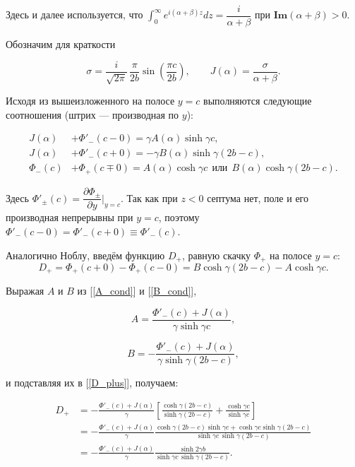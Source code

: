 \documentclass[a4paper,12pt]{article}
\begin{document}
Здесь и далее используется, что $\int_0^\infty e^{i(\alpha+\beta)z}dz = \dfrac{i}{\alpha+\beta}$ при $\mathbf{Im}(\alpha+\beta) > 0$.

Обозначим для краткости

\begin{equation}
\sigma = \frac{i}{\sqrt{2\pi}}\,\dfrac{\pi}{2b}\sin\!\left(\dfrac{\pi c}{2b}\right),
\qquad
J(\alpha)=
\frac{\sigma}{\alpha+\beta}.
\end{equation}

Исходя из вышеизложенного на полосе $y = c$ выполняются следующие соотношения (штрих --- производная по $y$):

\begin{align}
J(\alpha) &+ \Phi'_-(c-0) = \gamma A(\alpha)\sinh\gamma c, \label{A_cond} \\
J(\alpha) &+ \Phi'_-(c+0) = -\gamma B(\alpha)\sinh\gamma(2b-c), \label{B_cond} \\
\Phi_-(c) &+ \Phi_+(c\mp 0) = A(\alpha)\cosh\gamma c \ \ \text{или}\ \ B(\alpha)\cosh\gamma(2b-c).
\end{align}

Здесь $\Phi'_{\pm}(c) = \dfrac{\partial \Phi_{\pm}}{\partial y} \Bigg|_{y = c}$. Так как при $z<0$ септума нет, поле и его производная непрерывны при $y=c$, поэтому $\Phi'_-(c-0) = \Phi'_-(c+0) \equiv \Phi'_-(c)$.

Аналогично Ноблу, введём функцию $D_+$, равную скачку $\Phi_+$ на полосе $y = c$:
\begin{equation}
D_+=
\Phi_+(c+0)-\Phi_+(c-0)
=
B\cosh\gamma(2b-c)
-
A\cosh\gamma c. \label{D_plus}
\end{equation}

Выражая $A$ и $B$ из [\ref{A_cond}] и [\ref{B_cond}],

\[
A=
\frac{\Phi'_-(c)+J(\alpha)}
{\gamma\sinh\gamma c},
\]

\[
B=
-\frac{\Phi'_-(c)+J(\alpha)}
{\gamma\sinh\gamma(2b-c)},
\]

и подставляя их в [\ref{D_plus}], получаем:

\begin{align*}
D_+
&=
-\frac{\Phi'_-(c)+J(\alpha)}{\gamma}
\left[
\frac{\cosh\gamma(2b-c)}
{\sinh\gamma(2b-c)}
+
\frac{\cosh\gamma c}
{\sinh\gamma c}
\right]
\\
&=
-\frac{\Phi'_-(c)+J(\alpha)}{\gamma}
\frac{
\cosh\gamma(2b-c)\sinh\gamma c
+
\cosh\gamma c\sinh\gamma(2b-c)
}
{
\sinh\gamma c\,
\sinh\gamma(2b-c)
}
\\
&=
-\frac{\Phi'_-(c)+J(\alpha)}{\gamma}
\frac{
\sinh2\gamma b
}
{
\sinh\gamma c\,
\sinh\gamma(2b-c)
}.
\end{align*}
\end{document}
